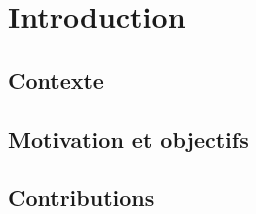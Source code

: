 
\chapter{Introduction}

\label{ch:introduction}

\section{Contexte}

\lipsum[1]

\section{Motivation et objectifs}

\lipsum[1]

\section{Contributions}

\lipsum[1]